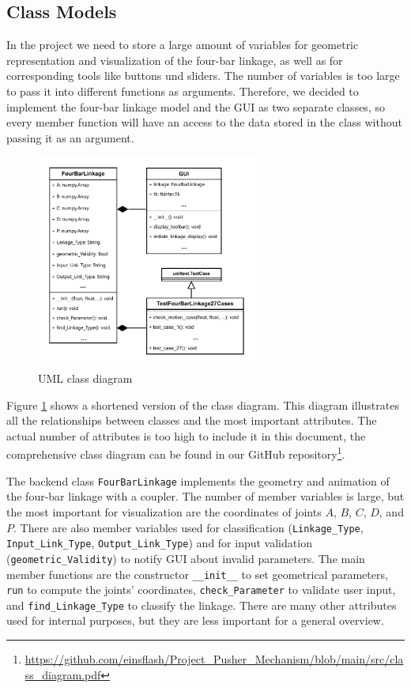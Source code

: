 \documentclass{article}
\begin{document}
\subsection{Class Models}

In the project we need to store a large amount of variables for geometric representation and visualization of the four-bar linkage, as well as for corresponding tools like buttons und sliders. The number of variables is too large to pass it into different functions as arguments. Therefore, we decided to implement the four-bar linkage model and the GUI as two separate classes, so every member function will have an access to the data stored in the class without passing it as an argument.

\begin{figure}[h]
	\begin{center}
		\includegraphics[width=0.65\textwidth]{./figures/class_diagram.pdf}
	\end{center}
	\caption{UML class diagram}
	\label{fig:class diagram}
\end{figure}

Figure \ref{fig:class diagram} shows a shortened version of the class diagram. This diagram illustrates all the relationships between classes and the most important attributes. The actual number of attributes is too high to include it in this document, the comprehensive class diagram can be found in our GitHub repository\footnote{\url{https://github.com/einsflash/Project_Pusher_Mechanism/blob/main/src/class_diagram.pdf}}.

The backend class \texttt{FourBarLinkage} implements the geometry and animation of the four-bar linkage with a coupler. The number of member variables is large, but the most important for visualization are the coordinates of joints $A$, $B$, $C$, $D$, and $P$. There are also member variables used for classification (\texttt{Linkage\_Type}, \texttt{Input\_Link\_Type}, \texttt{Output\_Link\_Type}) and for input validation (\texttt{geometric\_Validity}) to notify GUI about invalid parameters. The main member functions are the constructor \texttt{\_\_init\_\_} to set geometrical parameters, \texttt{run} to compute the joints' coordinates, \texttt{check\_Parameter} to validate user input, and \texttt{find\_Linkage\_Type} to classify the linkage. There are many other attributes used for internal purposes, but they are less important for a general overview.
\end{document}
